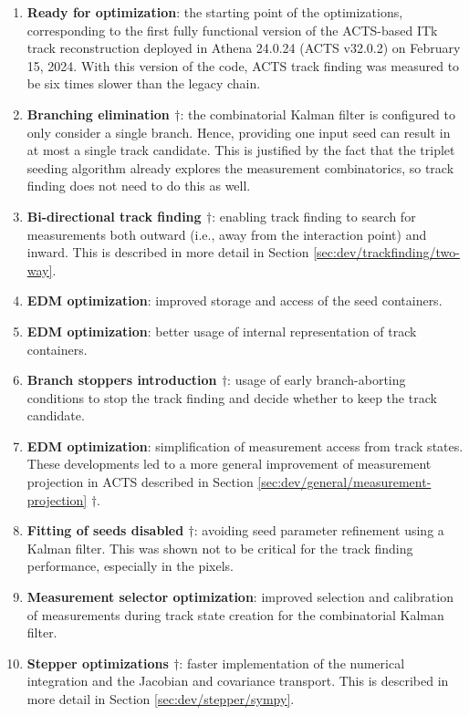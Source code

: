 \begin{enumerate}
    \item \textbf{Ready for optimization}: the starting point of the optimizations, corresponding to the first fully functional version of the ACTS-based ITk track reconstruction deployed in Athena 24.0.24 (ACTS v32.0.2) on February 15, 2024. With this version of the code, ACTS track finding was measured to be six times slower than the legacy chain.
    \item \textbf{Branching elimination $\dagger$}: the combinatorial Kalman filter is configured to only consider a single branch. Hence, providing one input seed can result in at most a single track candidate. This is justified by the fact that the triplet seeding algorithm already explores the measurement combinatorics, so track finding does not need to do this as well.
    \item \textbf{Bi-directional track finding $\dagger$}: enabling track finding to search for measurements both outward (i.e., away from the interaction point) and inward. This is described in more detail in Section \ref{sec:dev/trackfinding/two-way}.
    \item \textbf{EDM optimization}: improved storage and access of the seed containers.
    \item \textbf{EDM optimization}: better usage of internal representation of track containers.
    \item \textbf{Branch stoppers introduction $\dagger$}: usage of early branch-aborting conditions to stop the track finding and decide whether to keep the track candidate.
    \item \textbf{EDM optimization}: simplification of measurement access from track states. These developments led to a more general improvement of measurement projection in ACTS described in Section \ref{sec:dev/general/measurement-projection} $\dagger$.
    \item \textbf{Fitting of seeds disabled $\dagger$}: avoiding seed parameter refinement using a Kalman filter. This was shown not to be critical for the track finding performance, especially in the pixels.
    \item \textbf{Measurement selector optimization}: improved selection and calibration of measurements during track state creation for the combinatorial Kalman filter.
    \item \textbf{Stepper optimizations $\dagger$}: faster implementation of the numerical integration and the Jacobian and covariance transport. This is described in more detail in Section \ref{sec:dev/stepper/sympy}.

\end{enumerate}
